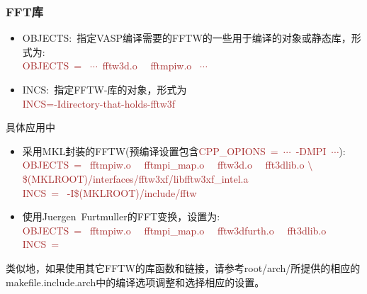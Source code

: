 \subsubsection{\rm{FFT}库}
\begin{itemize}
	\item \textrm{OBJECTS}:~指定\textrm{VASP}编译需要的\textrm{FFTW}的一些用于编译的对象或静态库，形式为:\\
\textcolor{brown}{\textrm{OBJECTS~= ~$\cdots$~fftw3d.o~~ fftmpiw.o~ $\cdots$}}
	\item \textrm{INCS}:~指定\textrm{FFTW}-库的对象，形式为\\
\textcolor{brown}{\textrm{INCS=-Idirectory-that-holds-fftw3f}}
\end{itemize}
具体应用中
\begin{itemize}
	\item 采用\textrm{MKL}封装的\textrm{FFTW}(预编译设置包含\textcolor{brown}{\textrm{CPP\_OPIONS~=~$\cdots$~-DMPI~$\cdots$}}):\\
		\textcolor{brown}{\textrm{
			OBJECTS~= ~fftmpiw.o~~ fftmpi\_map.o~~ fftw3d.o ~~fft3dlib.o $\setminus$ \\
         \$(MKLROOT)/interfaces/fftw3xf/libfftw3xf\_intel.a\\
INCS~=~ -I\$(MKLROOT)/include/fftw }}
	\item 使用\textrm{Juergen~Furtmuller}的\textrm{FFT}变换，设置为:\\
		\textcolor{brown}{\textrm{
			OBJECTS~= ~fftmpiw.o~~ fftmpi\_map.o~~ fftw3dfurth.o ~~fft3dlib.o \\
INCS~= }}
\end{itemize}
类似地，如果使用其它\textrm{FFTW}的库函数和链接，请参考\textrm{root/arch/}所提供的相应的\textrm{makefile.include.arch}中的编译选项调整和选择相应的设置。
